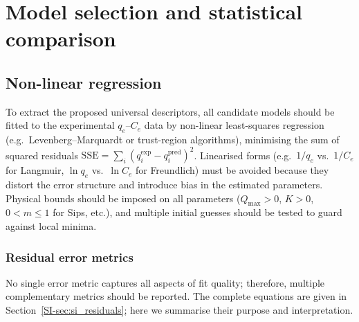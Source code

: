 \documentclass[journal=jacsat,manuscript=article]{achemso}
\begin{document}
	\section{Model selection and statistical comparison}
	\label{sec:model_selection}

	\subsection{Non-linear regression}
	\label{sec:fitting}

	To extract the proposed universal descriptors, all candidate models should be fitted to the experimental $q_e$--$C_e$ data by non-linear least-squares regression (e.g.\ Levenberg--Marquardt or trust-region algorithms), minimising the sum of squared residuals $\mathrm{SSE} = \sum_i (q_i^{\exp} - q_i^{\mathrm{pred}})^2$. Linearised forms (e.g.\ $1/q_e$ vs.\ $1/C_e$ for Langmuir, $\ln q_e$ vs.\ $\ln C_e$ for Freundlich) must be avoided because they distort the error structure and introduce bias in the estimated parameters. Physical bounds should be imposed on all parameters ($Q_{\max} > 0$, $K > 0$, $0 < m \leq 1$ for Sips, etc.), and multiple initial guesses should be tested to guard against local minima.

	\subsubsection{Residual error metrics}
	\label{sec:error_metrics}

	No single error metric captures all aspects of fit quality; therefore, multiple complementary metrics should be reported. The complete equations are given in Section~\ref{SI-sec:si_residuals}; here we summarise their purpose and interpretation.
\end{document}
